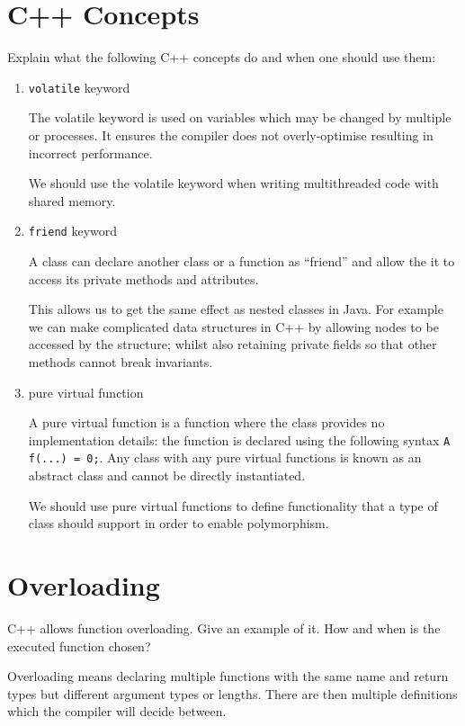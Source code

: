 \documentclass[10pt,\jkfside,a4paper]{article}
\begin{document}
\section{C++ Concepts}

Explain what the following C++ concepts do and when one should use them:

\begin{enumerate}[label=(\alph*)]

\item \texttt{volatile} keyword

The volatile keyword is used on variables which may be changed by multiple
or processes. It ensures the compiler does not overly-optimise resulting in
incorrect performance.

We should use the volatile keyword when writing multithreaded
code with shared memory.

\item \texttt{friend} keyword

A class can declare another class or a function as ``friend'' and allow the
it to access its private methods and attributes.

This allows us to get the same effect as nested classes in Java. For example
we can make complicated data structures in C++ by allowing nodes to be
accessed by the structure; whilst also retaining private fields so that
other methods cannot break invariants.

\item pure virtual function

A pure virtual function is a function where the class provides no
implementation details: the function is declared using the following syntax
\texttt{A f(...) = 0;}. Any class with any pure virtual functions is known
as an abstract class and cannot be directly instantiated.

We should use pure virtual functions to define functionality that a type of
class should support in order to enable polymorphism.

\end{enumerate}

\section{Overloading}

C++ allows function overloading. Give an example of it. How and when is the
executed function chosen?

Overloading means declaring multiple functions with the same name and return
types but different argument types or lengths. There are then multiple
definitions which the compiler will decide between.
\end{document}
